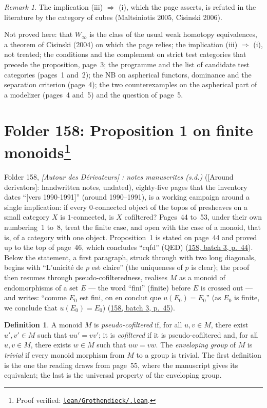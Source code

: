 \documentclass[11pt]{article}
\newcommand{\q}[1]{“#1”}
\newcommand{\fr}[1]{\textfrench{#1}}
\newcommand{\lot}[3]{\href{https://grothendieck.commutator.io/\##1/#2/p#3}{#1, batch #2, p.~#3}}
\newcommand{\verifie}[1]{\footnote{Proof verified: \href{https://github.com/Commutator-IO/grothendieck-project/blob/article-lean-2026-10/lean/Grothendieck/#1.lean}{\texttt{lean/Grothendieck/\detokenize{#1}.lean}}.}}
\theoremstyle{plain}
\theoremstyle{definition}
\newtheorem*{definition}{Definition}
\theoremstyle{remark}
\newtheorem*{remarque}{Remark}
\begin{document}
\begin{remarque}
The implication (iii) $\Rightarrow$ (i), which the page asserts, is refuted in the literature by the category of cubes (Maltsiniotis 2005, Cisinski 2006).
\end{remarque}

\noindent Not proved here: that $W_\infty$ is the class of the usual weak homotopy equivalences, a theorem of Cisinski (2004) on which the page relies; the implication (iii) $\Rightarrow$ (i), not treated; the conditions and the complement on strict test categories that precede the proposition, page~3; the programme and the list of candidate test categories (pages~1 and~2); the NB on aspherical functors, dominance and the separation criterion (page~4); the two counterexamples on the aspherical part of a modelizer (pages~4 and~5) and the question of page~5.

\section[Folder 158: Proposition 1 on finite monoids]{Folder 158: Proposition 1 on finite monoids\protect\verifie{Folder158}}\label{sec:158}

Folder 158, \emph{\fr{[Autour des Dérivateurs] : notes manuscrites (s.d.)}} ([Around derivators]: handwritten notes, undated), eighty-five pages that the inventory dates \q{\fr{[vers 1990-1991]}} (around 1990--1991), is a working campaign around a single implication: if every $0$-connected object of the topos of presheaves on a small category $X$ is $1$-connected, is $X$ cofiltered? Pages~44 to~53, under their own numbering~1 to~8, treat the finite case, and open with the case of a monoid, that is, of a category with one object. Proposition~1 is stated on page~44 and proved up to the top of page~46, which concludes \q{\fr{cqfd}} (QED) (\lot{158}{3}{44}). Below the statement, a first paragraph, struck through with two long diagonals, begins with \q{\fr{L'unicité de $p$ est claire}} (the uniqueness of $p$ is clear); the proof then resumes through pseudo-cofilteredness, realises $M$ as a monoid of endomorphisms of a set $E$ --- the word \q{\fr{fini}} (finite) before $E$ is crossed out --- and writes: \q{\fr{comme $E_0$ est fini, on en conclut que $u(E_0) = E_0$}} (as $E_0$ is finite, we conclude that $u(E_0) = E_0$) (\lot{158}{3}{45}).

\begin{definition}
A monoid $M$ is \emph{pseudo-cofiltered} if, for all $u, v \in M$, there exist $u', v' \in M$ such that $uu' = vv'$; it is \emph{cofiltered} if it is pseudo-cofiltered and, for all $u, v \in M$, there exists $w \in M$ such that $uw = vw$. The \emph{enveloping group} of $M$ is \emph{trivial} if every monoid morphism from $M$ to a group is trivial. The first definition is the one the reading draws from page~55, where the manuscript gives its equivalent; the last is the universal property of the enveloping group.
\end{definition}
\end{document}

